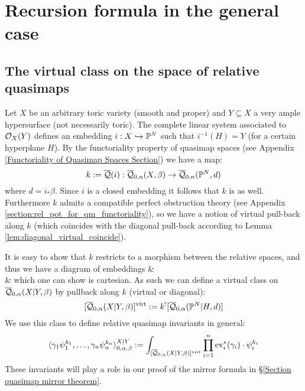 \section{Recursion formula in the general case}\label{Section recursion formula in general case}

\subsection{The virtual class on the space of relative quasimaps} Let $X$ be an arbitrary toric variety (smooth and proper) and $Y \subseteq X$ a very ample hypersurface (not necessarily toric). The complete linear system associated to $\mathcal{O}_X(Y)$ defines an embedding $i : X \hookrightarrow \mathbb P^N$ such that $i^{-1}(H) = Y$ (for a certain hyperplane $H$). By the functoriality property of quasimap spaces (see Appendix \ref{Functoriality of Quasimap Spaces Section}) we have a map:
\begin{equation*} k := \overline{\mathcal{Q}}(i) : \overline{\mathcal Q}_{0,n}(X,\beta) \rightarrow \overline{\mathcal Q}_{0,n}(\mathbb P^N,d) \end{equation*}
where $d=i_*\beta$. Since $i$ is a closed embedding it follows that $k$ is as well. Furthermore $k$ admits a compatible perfect obstruction theory (see Appendix \ref{section:rel_pot_for_qm_functoriality}), so we have a notion of virtual pull-back along $k$ (which coincides with the diagonal pull-back according to Lemma \ref{lem:diagonal_virtual_coincide}).

It is easy to show that $k$ restricts to a morphism between the relative spaces, and thus we have a diagram of embeddings
\bcd
{} \ar[d, "f", hook] \ar[r, "g", hook]  &  \ar[d, "j", hook] \\
  \ar[r, "k", hook] & 
\ecd
which one can show is cartesian. As such we can define a virtual class on $\overline{\mathcal Q}_{0,\alpha}(X|Y,\beta)$ by pullback along $k$ (virtual or diagonal):
\begin{equation*} [\overline{\mathcal Q}_{0,\alpha}(X|Y,\beta)]^{\operatorname{virt}} := k^! [ \overline{\mathcal Q}_{0,\alpha}(\mathbb P^N|H,d) ] \end{equation*}
We use this class to define relative quasimap invariants in general:
\begin{equation*} \langle \gamma_1 \psi_1^{k_1}, \ldots, \gamma_n \psi_n^{k_n} \rangle_{0,\alpha,\beta}^{X|Y} := \int_{[\overline{\mathcal Q}_{0,\alpha}(X|Y,\beta)]^{\operatorname{virt}}} \prod_{i=1}^n \operatorname{ev}_i^*(\gamma_i) \cdot \psi_i^{k_i} \end{equation*}
These invariants will play a role in our proof of the mirror formula in \S \ref{Section quasimap mirror theorem}.

